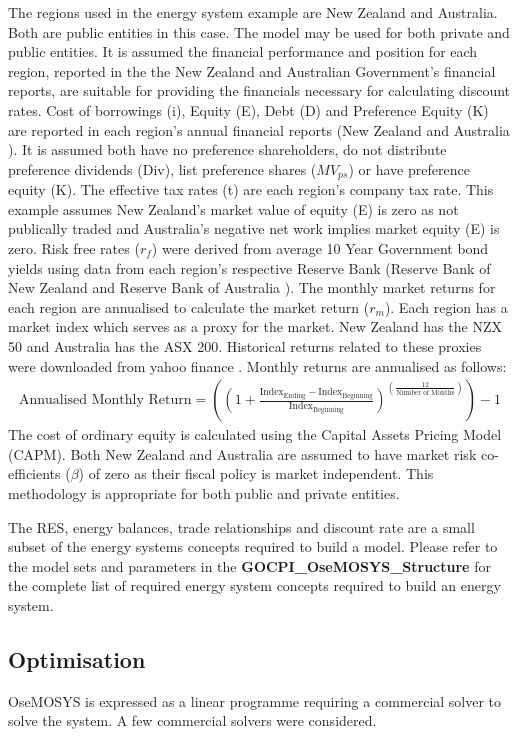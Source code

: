 \documentclass[12pt]{article}
\begin{document}
The regions used in the energy system example are New Zealand and Australia. 
Both are public entities in this case.
The model may be used for both private and public entities.
It is assumed the financial performance and position for each region, reported in the the New Zealand and Australian Government's financial reports, are suitable for providing the financials necessary for calculating discount rates.
Cost of borrowings (i), Equity (E),  Debt (D) and Preference Equity (K) 
are reported in each region's annual financial reports (New Zealand \cite{TNZ_FR} and Australia \cite{AG_FR}).
It is assumed both have no preference shareholders, do not distribute preference dividends (Div), list preference shares ($MV_{ps}$) or have preference equity (K).
The effective tax rates (t) are each region's company tax rate. 
This example assumes New Zealand's market value of equity (E) is zero as not publically traded and Australia's negative net work implies market equity (E) is zero.
Risk free rates ($r_f$) were derived from average 10 Year Government bond yields using data from each region's respective 
Reserve Bank (Reserve Bank of New Zealand \cite{RBNZ_WIR} and Reserve Bank of Australia \cite{RBA_ZCL}). 
The monthly market returns for each region are annualised to calculate the market return ($r_m$). 
Each region has a market index which serves as a proxy for the market. 
New Zealand has the NZX 50 and Australia has the ASX 200. Historical returns related to these proxies were downloaded from yahoo finance \cite{ASX_NZ}.
Monthly returns are annualised as follows: 
\begin{align}
	\text{Annualised Monthly Return} = ((1 + \frac{\text{Index}_{\text{Ending}}-\text{Index}_{\text{Beginning}}}{\text{Index}_{\text{Beginning}}})^{(\frac{12}{\text{Number of Months}})})-1
\end{align}
The cost of ordinary equity is calculated using the Capital Assets Pricing Model (CAPM). 
Both New Zealand and Australia are assumed to have market risk co-efficients ($\beta$) of zero as their fiscal policy is market independent.
This methodology is appropriate for both public and private entities.

The RES, energy balances, trade relationships and discount rate are a small subset of the energy systems concepts required to build a model.
Please refer to the model sets and parameters in the \textbf{GOCPI\_OseMOSYS\_Structure} for the complete list of required energy system concepts required to build an energy system.

\subsection{Optimisation}
OseMOSYS is expressed as a linear programme requiring a commercial solver to solve the system.
A few commercial solvers were considered.
\end{document}
